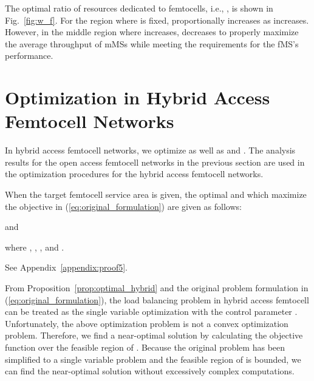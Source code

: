 \documentclass[journal]{IEEEtran}
\begin{document}
The optimal ratio of resources dedicated to femtocells, i.e., , is shown in
Fig.~\ref{fig:w_f}. For the region where  is fixed,  proportionally increases
as  increases. However, in the middle region where 
increases,  decreases to properly maximize the average throughput of mMSs
while meeting the requirements for the fMS's performance.


\section{Optimization in Hybrid Access Femtocell Networks}
\label{sec:optimization_hybrid}
In hybrid access femtocell networks,
we optimize  as well as  and .
The analysis results for the open access femtocell networks in
the previous section are used in the optimization procedures
for the hybrid access femtocell networks.
\begin{prop}\label{prop:optimal_hybrid}
When the target femtocell service area  is given, the optimal  and 
which maximize the objective in (\ref{eq:original_formulation}) are given as follows:

and

where
,
,
, and
.
\end{prop}
\begin{IEEEproof}
See Appendix~\ref{appendix:proof5}.
\end{IEEEproof}
From Proposition~\ref{prop:optimal_hybrid} and the original problem formulation in (\ref{eq:original_formulation}),
the load balancing problem in hybrid access femtocell can be treated as the single
variable optimization with the control parameter .
Unfortunately, the above optimization problem is not a convex optimization problem.
Therefore, we find a near-optimal solution by calculating the objective function over the
feasible region of .
Because the original problem has been simplified to a single variable problem and
the feasible region of  is bounded,
we can find the near-optimal solution 
without excessively complex computations.
\end{document}

